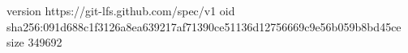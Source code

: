 version https://git-lfs.github.com/spec/v1
oid sha256:091d688c1f3126a8ea639217af71390ce51136d12756669c9e56b059b8bd45ce
size 349692
